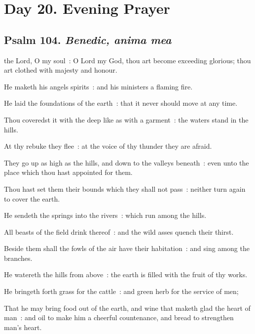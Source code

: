 \clearpage
\section*{Day 20. Evening Prayer}

\subsection{Psalm 104. \textit{Benedic, anima mea}}

 the Lord, O my soul~: O Lord my God, thou art become exceeding glorious; thou art clothed with majesty and honour.\par
{}
He maketh his angels spirits~: and his ministers a flaming fire.\par
{}He laid the foundations of the earth~: that it never should move at any time.\par
{}Thou coveredst it with the deep like as with a garment~: the waters stand in the hills.\par
{}At thy rebuke they flee~: at the voice of thy thunder they are afraid.\par
{}They go up as high as the hills, and down to the valleys beneath~: even unto the place which thou hast appointed for them.\par
{}Thou hast set them their bounds which they shall not pass~: neither turn again to cover the earth.\par
{}He sendeth the springs into the rivers~: which run among the hills.\par
{}All beasts of the field drink thereof~: and the wild asses quench their thirst.\par
{}Beside them shall the fowls of the air have their habitation~: and sing among the branches.\par
{}He watereth the hills from above~: the earth is filled with the fruit of thy works.\par
{}He bringeth forth grass for the cattle~: and green herb for the service of men;\par
{}That he may bring food out of the earth, and wine that maketh glad the heart of man~: and oil to make him a cheerful countenance, and bread to strengthen man's heart.\par
